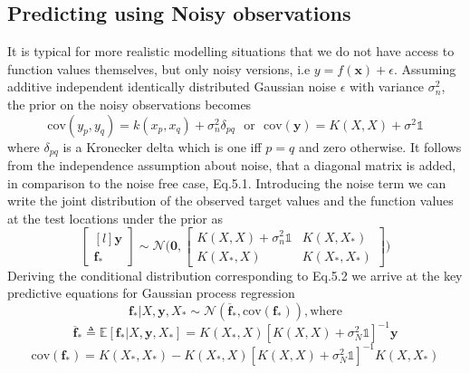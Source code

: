 \documentclass[twoside]{article}
\begin{document}
\subsection{Predicting using Noisy observations}
It is typical for more realistic modelling situations that we do not have access to function values themselves, but only noisy versions, i.e $y = f(\boldsymbol{x}) + \epsilon$. Assuming additive independent identically distributed Gaussian noise $\epsilon$ with variance $\sigma^2_n$, the prior on the noisy observations becomes
\begin{equation*}
    \text{cov}(y_p, y_q) = k(x_p, x_q) + \sigma^2_n\delta_{pq} \hspace{8pt}\text{or}\hspace{8pt} \text{cov}(\boldsymbol{y}) = K(X, X) + \sigma^2\mathds{1}
\end{equation*}
where $\delta_{pq}$ is a Kronecker delta which is one iff $p = q$ and zero otherwise. It follows from the independence assumption about noise, that a diagonal matrix is added, in comparison to the noise free case, Eq.5.1. Introducing the noise term we can write the joint distribution of the observed target values and the function values at the test locations under the prior as
\begin{equation*}
    \begin{bmatrix*}[l]
\boldsymbol{y}\\
\textbf{f}_*
\end{bmatrix*}
\sim \mathcal{N}\Bigg(\boldsymbol{0}, \begin{bmatrix*}
K(X, X) +  \sigma^2_n\mathds{1} & K(X, X_*)\\
K(X_*, X) & K(X_*, X_*)
\end{bmatrix*}\Bigg)
\end{equation*}
Deriving the conditional distribution corresponding to Eq.5.2 we arrive at the key predictive equations for Gaussian process regression
\begin{equation*}
    \textbf{f}_*|X,\textbf{y},X_* \sim \mathcal{N}(\overline{\textbf{f}}_*, \text{cov}(\textbf{f}_*)), \text{where}
\end{equation*}
\begin{equation}
    \overline{\textbf{f}}_* \triangleq \mathbb{E}[\textbf{f}_*|X, \boldsymbol{y}, X_*] = K(X_*, X)[K(X, X) + \sigma^2_N\mathds{1}]^{-1}\boldsymbol{y}
\end{equation}
\begin{equation}
    \text{cov}(\textbf{f}_*) = K(X_*, X_*) - K(X_*, X)[K(X, X) + \sigma^2_N\mathds{1}]^{-1}K(X, X_*)
\end{equation}\medskip
\end{document}
